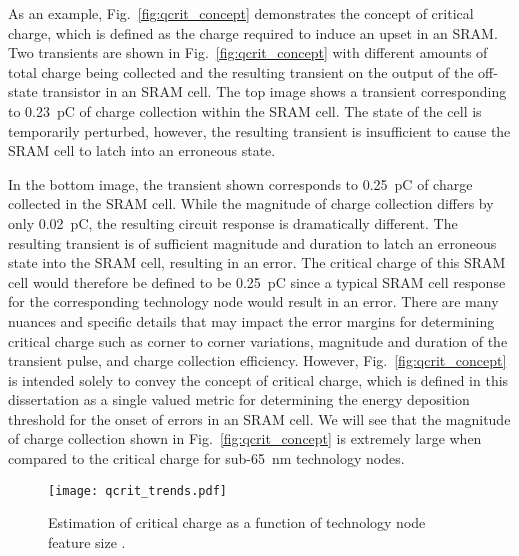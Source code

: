 As an example, Fig.~\ref{fig:qcrit_concept} demonstrates the concept of critical charge, which is defined as the charge required to induce an upset in an SRAM.
Two transients are shown in Fig.~\ref{fig:qcrit_concept} with different amounts of total charge being collected and the resulting transient on the output of the off-state transistor in an SRAM cell.
The top image shows a transient corresponding to 0.23~pC of charge collection within the SRAM cell.
The state of the cell is temporarily perturbed, however, the resulting transient is insufficient to cause the SRAM cell to latch into an erroneous state.

In the bottom image, the transient shown corresponds to 0.25~pC of charge collected in the SRAM cell. 
While the magnitude of charge collection differs by only 0.02~pC, the resulting circuit response is dramatically different. 
The resulting transient is of sufficient magnitude and duration to latch an erroneous state into the SRAM cell, resulting in an error.
The critical charge of this SRAM cell would therefore be defined to be 0.25~pC since a typical SRAM cell response for the corresponding technology node  would result in an error.
There are many nuances and specific details that may impact the error margins for determining critical charge such as corner to corner variations, magnitude and duration of the transient pulse, and charge collection efficiency. 
However, Fig.~\ref{fig:qcrit_concept} is intended solely to convey the concept of critical charge, which is defined in this dissertation as a single valued metric for determining the energy deposition threshold for the onset of errors in an SRAM cell.
We will see that the magnitude of charge collection shown in Fig.~\ref{fig:qcrit_concept} is extremely large when compared to the critical charge for sub-65~nm technology nodes.

\begin{figure}[htbp]
    \begin{center}
        \texttt{[image: qcrit\_trends.pdf]}
    \end{center}
    \caption[Estimation of critical charge as a function of technology node feature size.]{Estimation of critical charge as a function of technology node feature size \cite{Sierawski:2011tc}.}
    \label{fig:qcrit_trends}
\end{figure}

